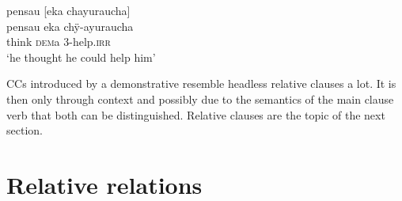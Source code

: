 \ea\label{ex:pensau-2}
\begingl
\glpreamble pensau \textup{[}eka chayuraucha\textup{]}\\
\gla pensau eka chÿ-ayuraucha\\
\glb think \textsc{dem}a 3-help.\textsc{irr}\\
\glft ‘he thought he could help him’
\endgl
\trailingcitation{[jxx-e120516l-1.094]}
\xe


%
%









CCs introduced by a demonstrative resemble headless relative clauses a lot. It is then only through context and possibly due to the semantics of the main clause verb that both can be distinguished. Relative clauses are the topic of the next section.









\section{Relative relations}\label{sec:RelativeClauses}

